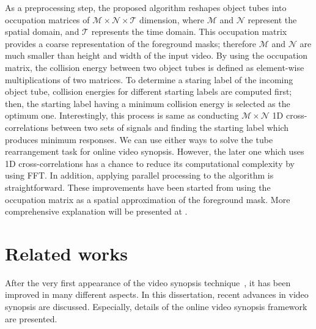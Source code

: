 \documentclass[11pt]{hyu_thesis}
\begin{document}
As a preprocessing step, the proposed algorithm reshapes object tubes into occupation matrices of $\mathcal{M} \times \mathcal{N} \times \mathcal{T}$ dimension, where $\mathcal{M}$ and $\mathcal{N}$ represent the spatial domain, and $\mathcal{T}$ represents the time domain. This occupation matrix provides a coarse representation of the foreground masks; therefore $\mathcal{M}$ and $\mathcal{N}$ are much smaller than height and width of the input video. By using the occupation matrix, the collision energy between two object tubes is defined as element-wise multiplications of two matrices. To determine a staring label of the incoming object tube, collision energies for different starting labels are computed first; then, the starting label having a minimum collision energy is selected as the optimum one. Interestingly, this process is same as conducting $\mathcal{M}\times\mathcal{N}$ 1D cross-correlations between two sets of signals and finding the starting label which produces minimum responses. We can use either ways to solve the tube rearrangement task for online video synopsis. However, the later one which uses 1D cross-correlations has a chance to reduce its computational complexity by using FFT. In addition, applying parallel processing to the algorithm is straightforward. These improvements have been started from using the occupation matrix as a spatial approximation of the foreground mask. More comprehensive explanation will be presented at .

\section{Related works}
\label{sec:intro:related}
After the very first appearance of the video synopsis technique~\cite{Rav-Acha2006}, it has been improved in many different aspects. In this dissertation, recent advances in video synopsis are discussed. Especially, details of the online video synopsis framework are presented.
\end{document}
